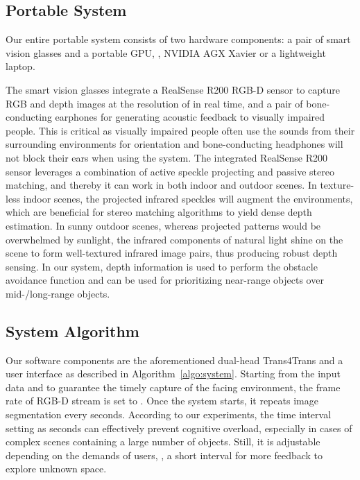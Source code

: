 \documentclass[10pt,twocolumn,letterpaper]{article}
\begin{document}
\subsection{Portable System}
Our entire portable system consists of two hardware components: a pair of smart vision glasses and a portable GPU, \eg, NVIDIA AGX Xavier or a lightweight laptop.

The smart vision glasses integrate a RealSense R200 RGB-D sensor to capture RGB and depth images at the resolution of  in real time, and a pair of bone-conducting earphones for generating acoustic feedback to visually impaired people.
This is critical as visually impaired people often use the sounds from their surrounding environments for orientation and bone-conducting headphones will not block their ears when using the system. 
The integrated RealSense R200 sensor leverages a combination of active speckle projecting and passive stereo matching, and thereby it can work in both indoor and outdoor scenes.
In texture-less indoor scenes, the projected infrared speckles will augment the environments, which are beneficial for stereo matching algorithms to yield dense depth estimation.
In sunny outdoor scenes, whereas projected patterns would be overwhelmed by sunlight, the infrared components of natural light shine on the scene to form well-textured infrared image pairs, thus producing robust depth sensing.
In our system, depth information is used to perform the obstacle avoidance function and can be used for prioritizing near-range objects over mid-/long-range objects.

\subsection{System Algorithm}
Our software components are the aforementioned dual-head Trans4Trans and a user interface as described in Algorithm~\ref{algo:system}.
Starting from the input data and to guarantee the timely capture of the facing environment, the frame rate of RGB-D stream is set to . Once the system starts, it repeats image segmentation every  seconds. According to our experiments, the time interval setting as  seconds can effectively prevent cognitive overload, especially in cases of complex scenes containing a large number of objects. Still, it is adjustable depending on the demands of users, \eg, a short interval for more feedback to explore unknown space.
\end{document}
